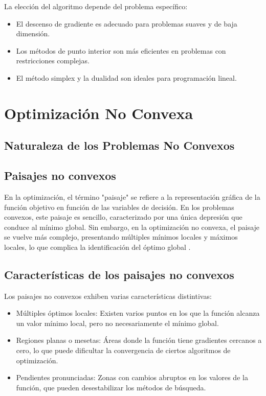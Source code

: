 La elección del algoritmo depende del problema específico:
\begin{itemize}
	\item El descenso de gradiente es adecuado para problemas suaves y de baja dimensión.
	\item Los métodos de punto interior son más eficientes en problemas con restricciones complejas.
	\item El método simplex y la dualidad son ideales para programación lineal.
\end{itemize}
\section{Optimización No Convexa}

\subsection{Naturaleza de los Problemas No Convexos}

\subsection{Paisajes no convexos}

En la optimización, el término "paisaje" se refiere a la representación gráfica de la función objetivo en función de las variables de decisión. En los problemas convexos, este paisaje es sencillo, caracterizado por una única depresión que conduce al mínimo global. Sin embargo, en la optimización no convexa, el paisaje se vuelve más complejo, presentando múltiples mínimos locales y máximos locales, lo que complica la identificación del óptimo global \cite{boyd2004convex}.

\subsection{Características de los paisajes no convexos}

Los paisajes no convexos exhiben varias características distintivas:

\begin{itemize}
	\item Múltiples óptimos locales: Existen varios puntos en los que la función alcanza un valor mínimo local, pero no necesariamente el mínimo global.
	\item Regiones planas o mesetas: Áreas donde la función tiene gradientes cercanos a cero, lo que puede dificultar la convergencia de ciertos algoritmos de optimización.
	\item Pendientes pronunciadas: Zonas con cambios abruptos en los valores de la función, que pueden desestabilizar los métodos de búsqueda.
\end{itemize}

